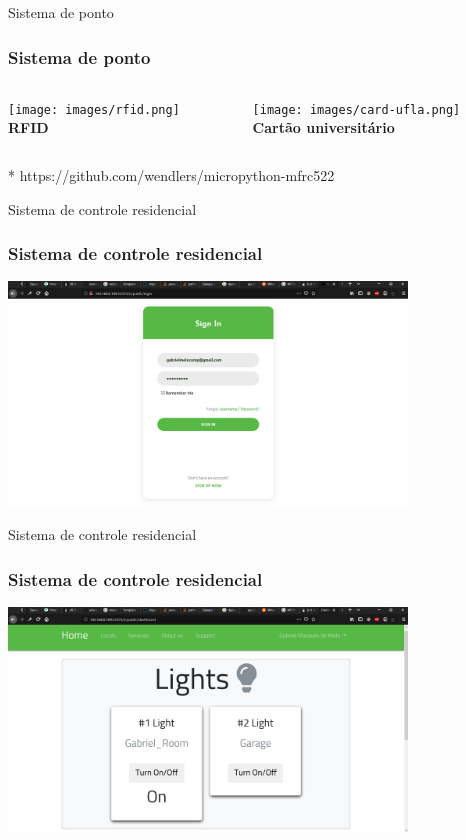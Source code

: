 \documentclass[10pt, compress]{beamer}
\begin{document}
\begin{frame}{Sistema de ponto}
  \frametitle{Sistema de ponto}
    \begin{columns}
      \begin{column}{0.48\textwidth}
        \begin{center}
          \texttt{[image: images/rfid.png]}\\
          \vspace{20pt}
          \textbf{RFID}
       \end{center}
      \end{column}
      \begin{column}{0.48\textwidth}
        \vspace{-60pt}
        \begin{center}
          \texttt{[image: images/card-ufla.png]}\\
          \textbf{Cartão universitário}
        \end{center}
      \end{column}
    \end{columns}

 \vspace{40pt}
 * https://github.com/wendlers/micropython-mfrc522
\end{frame}

\begin{frame}{Sistema de controle residencial}
  \frametitle{Sistema de controle residencial}

    \hfill\includegraphics[width=300pt]{images/iot-server_login.png}\hspace*{\fill}
\end{frame}

\begin{frame}{Sistema de controle residencial}
  \frametitle{Sistema de controle residencial}
  \begin{center}
    \includegraphics[width=300pt]{images/iot-server_dash1.png}
  \end{center}
\end{frame}
\end{document}
